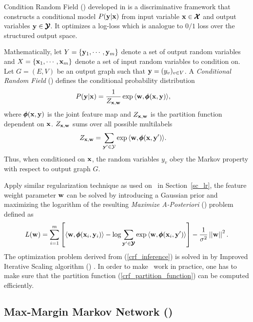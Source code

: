 {Condition Random Field (\crf) developed in \citep{lafferty01,taskar02} is a discriminative framework that constructs a conditional model $P(\mathbf {y}|\mathbf {x})$ from input variable $\mathbf {x}\in\pmb {\mathcal{X}}$ and output variables $\mathbf {y}\in\pmb {\mathcal{Y}}$.
It optimizes a log-loss which is analogue to $0/1$ loss over the structured output space.

Mathematically, let $Y=\{\mathbf {y}_1,\cdots,\mathbf {y}_m\}$ denote a set of output random variables and $X=\{\mathbf {x}_1,\cdots,\mathbf {x}_m\}$ denote a set of input random variables to condition on.
Let $G=(E,V)$ be an output graph such that $\mathbf {y} = (y_v)_{v\in V}$.
A \textit{Conditional Random Field} (\crf) defines the conditional probability distribution
\begin{align*}
	P(\mathbf {y}|\mathbf {x}) &= \frac{1}{Z_{\mathbf {x},\mathbf {w}}}\exp{\langle \mathbf {w}, \pmb \phi(\mathbf {x},\mathbf {y}) \rangle},
\end{align*}
where $\pmb \phi(\mathbf {x},\mathbf {y})$ is the joint feature map and $Z_{\mathbf {x},\mathbf {w}}$ is the partition function dependent on $\mathbf {x}$.
$Z_{\mathbf {x},\mathbf {w}}$ sums over all possible multilabels 
\begin{align}
	Z_{\mathbf {x},\mathbf {w}} &= \sum_{\mathbf {y}'\in\mathcal{Y}}\exp{\langle \mathbf {w}, \pmb \phi(\mathbf {x},\mathbf {y}') \rangle}. \label{crf_partition_function}
\end{align}
Thus, when conditioned on $\mathbf {x}$, the random variables $y_v$ obey the Markov property with respect to output graph $G$.

Apply similar regularization technique as used on \lr\ in Section~\ref{sc_lr}, the feature weight parameter $\mathbf {w}$ can be solved by introducing a Gaussian prior and maximizing the logarithm of the resulting \textit{Maximize A-Posteriori} (\map) problem \citep{taskar02} defined as
\begin{align}
	L(\mathbf {w}) = \sum_{i=1}^{m}\left[\langle \mathbf {w}, \pmb \phi(\mathbf {x}_i,\mathbf {y}_i) \rangle-\log{\sum_{\mathbf {y}'\in\pmb {\mathcal{Y}}}{\exp{\langle \mathbf {w}, \pmb \phi(\mathbf {x}_i,\mathbf {y}') \rangle}}}\right] - \frac{1}{\sigma^2}\left|\left| \mathbf {w} \right|\right|^2. \label{crf_inference}
\end{align}
The optimization problem derived from (\ref{crf_inference}) is solved in \citep{lafferty01} by Improved Iterative Scaling algorithm (\iis) \citep{Pietra97inducing}.
In order to make \crf\ work in practice, one has to make sure that the partition function (\ref{crf_partition_function}) can be computed efficiently.



%
% 
\subsection{Max-Margin Markov Network (\mmmn)} \label{sc_mmmn}

}
